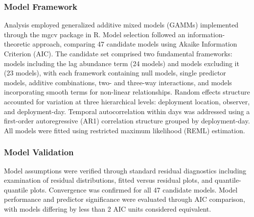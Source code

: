 \subsubsection{Model Framework}

Analysis employed generalized additive mixed models (GAMMs) implemented through the mgcv package in R. Model selection followed an information-theoretic approach, comparing 47 candidate models using Akaike Information Criterion (AIC). The candidate set comprised two fundamental frameworks: models including the lag abundance term (24 models) and models excluding it (23 models), with each framework containing null models, single predictor models, additive combinations, two- and three-way interactions, and models incorporating smooth terms for non-linear relationships. Random effects structure accounted for variation at three hierarchical levels: deployment location, observer, and deployment-day. Temporal autocorrelation within days was addressed using a first-order autoregressive (AR1) correlation structure grouped by deployment-day. All models were fitted using restricted maximum likelihood (REML) estimation.

\subsubsection{Model Validation}

Model assumptions were verified through standard residual diagnostics including examination of residual distributions, fitted versus residual plots, and quantile-quantile plots. Convergence was confirmed for all 47 candidate models. Model performance and predictor significance were evaluated through AIC comparison, with models differing by less than 2 AIC units considered equivalent.

